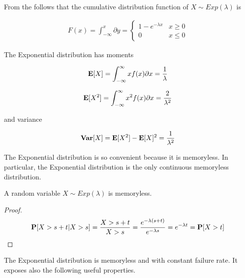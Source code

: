 From the  follows that the cumulative distribution function of $X \sim Exp(\lambda)$ is

\begin{equation}
\label{eqn:Exponential-CDF}
\begin{aligned}
	F(x) = \int_{- \infty}^{x} \partial y = 
	\left\{\begin{matrix}
	1 - e^{-\lambda x} & x \geq 0\\ 
	0 & x \leq 0
	\end{matrix}\right.
\end{aligned}
\end{equation}

The Exponential distribution has moments

\begin{equation}
\label{eqn:Exponential-Mean}
\expected{X} = \int_{- \infty}^{\infty} xf(x) \partial x = \frac{1}{\lambda}
\end{equation}

\begin{equation}
\label{eqn:Exponential-Moment-2}
\expected{X^{2}} = \int_{- \infty}^{\infty} x^{2}f(x) \partial x = \frac{2}{\lambda^{2}}
\end{equation}

and variance

\begin{equation}
\label{eqn:Exponential-Variance}
	\variance{X} = \expected{X^{2}} - \expected{X}^{2} = \frac{1}{\lambda^{2}}
\end{equation}

The Exponential distribution is so convenient because it is memoryless. In particular, the Exponential distribution is the only continuous memoryless distribution.

\begin{theorem}
\label{thm:Exponential-Memoryless}

	A random variable $X \sim Exp(\lambda)$ is memoryless.
	
	\begin{proof}
		\begin{equation*}
		\mathbf{P}[X > s+t | X > s]=\frac{X > s+t}{X > s}=\frac{e^{- \lambda (s+t)}}{e^{- \lambda s}}=e^{- \lambda t}=\mathbf{P}[X > t]
		\end{equation*}
	\end{proof}
\end{theorem}

The Exponential distribution is memoryless and with constant failure rate. It exposes also the following useful properties.

